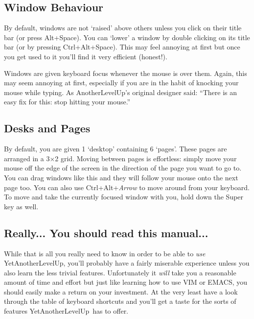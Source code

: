 \documentclass[a4paper,11pt]{article}
\newcommand{\yalu}{YetAnotherLevelUp}
\newcommand{\alu}{AnotherLevelUp}
\begin{document}
		\subsection{Window Behaviour}
		By default, windows are not `raised' above others unless you click on their
		title bar (or press Alt+Space). You can `lower' a window by double clicking
		on its title bar (or by pressing Ctrl+Alt+Space). This may feel annoying at
		first but once you get used to it you'll find it very efficient (honest!).
		
		Windows are given keyboard focus whenever the mouse is over them. Again,
		this may seem annoying at first, especially if you are in the habit of
		knocking your mouse while typing. As \alu's original designer said: ``There
		is an easy fix for this: stop hitting your mouse.''
		
		\subsection{Desks and Pages}
		By default, you are given 1 `desktop' containing 6 `pages'. These pages are
		arranged in a 3$\times$2 grid. Moving between pages is effortless: simply
		move your mouse off the edge of the screen in the direction of the page you
		want to go to. You can drag windows like this and they will follow your
		mouse onto the next page too. You can also use Ctrl+Alt+\emph{Arrow} to
		move around from your keyboard. To move and take the currently focused
		window with you, hold down the Super key as well.
		
		\subsection{Really... You should read this manual...}
		While that is all you really need to know in order to be able to \emph{use}
		\yalu, you'll probably have a fairly miserable experience unless you also
		learn the less trivial features. Unfortunately it \emph{will} take you a
		reasonable amount of time and effort but just like learning how to use VIM
		or EMACS, you should easily make a return on your investment. At the very
		least have a look through the table of keyboard shortcuts and you'll get a
		taste for the sorts of features \yalu\ has to offer.
	
	\clearpage
	\newcommand{\subrule}{\cmidrule{2-3}}
\end{document}
